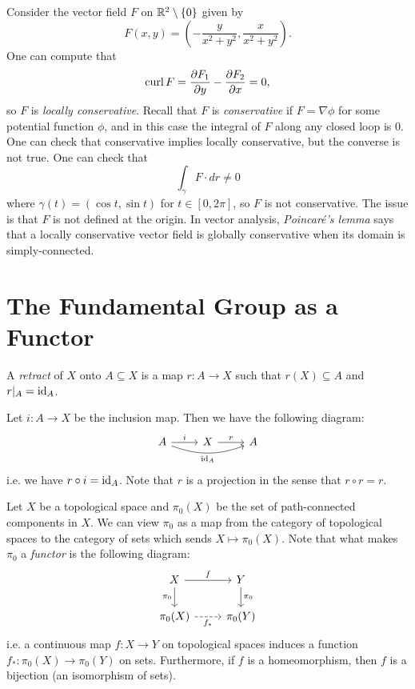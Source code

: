 \begin{example}
  Consider the vector field $F$ on
  $\mathbb{R}^2 \setminus \{0\}$ given by
  \[
    F(x, y) =
    \left(-\frac{y}{x^2 + y^2}, \frac{x}{x^2 + y^2}\right).
  \]
  One can compute that
  \[
    \operatorname{curl} F = \frac{\partial F_1}{\partial y} - \frac{\partial F_2}{\partial x} = 0,
  \]
  so $F$ is \emph{locally conservative}. Recall that
  $F$ is \emph{conservative} if $F = \nabla \phi$
  for some potential function $\phi$, and in this
  case the integral of $F$ along any closed loop is
  $0$. One can check
  that conservative implies locally conservative,
  but the converse is not true. One can check that
  \[
    \int_{\gamma} F \cdot dr \ne 0
  \]
  where $\gamma(t) = (\cos t, \sin t)$ for
  $t \in [0, 2\pi]$, so $F$ is not conservative.
  The issue is that $F$ is not defined at the origin.
  In vector analysis, \emph{Poincar\'e's lemma}
  says that a locally conservative vector field is
  globally conservative when its domain
  is simply-connected.
\end{example}

\section{The Fundamental Group as a Functor}
\begin{definition}
  A \emph{retract} of $X$ onto $A \subseteq X$ is a
  map $r : A \to X$ such that $r(X) \subseteq A$
  and $r|_A = \operatorname{id}_A$.
\end{definition}

\begin{remark}
  Let $i : A \to X$ be the inclusion map. Then
  we have the following diagram:
  \[
    \begin{tikzcd}
      A \ar[r, "i"] \ar[rr, bend right=20, "\id_A", swap]& X \ar[r, "r"] & A
    \end{tikzcd}
  \]
  i.e. we have $r \circ i = \operatorname{id}_A$. Note
  that $r$ is a projection in the sense that
  $r \circ r = r$.
\end{remark}

\begin{example}[Functoriality]
  Let $X$ be a topological space and
  $\pi_0(X)$ be the set of path-connected
  components in $X$. We can view $\pi_0$ as a
  map from the category of topological spaces to
  the category of sets which sends
  $X \mapsto \pi_0(X)$. Note that what makes
  $\pi_0$ a \emph{functor} is the following
  diagram:
  \[
    \begin{tikzcd}
      X \ar[r, "f"] \ar[d, "\pi_0"'] & Y \ar[d, "\pi_0"] \\
      \pi_0(X) \ar[r, "f_*"', dashed] & \pi_0(Y)
    \end{tikzcd}
  \]
  i.e. a continuous map $f : X \to Y$ on topological
  spaces
  induces a function $f_* : \pi_0(X) \to \pi_0(Y)$
  on sets. Furthermore, if $f$ is a homeomorphism,
  then $f$ is a bijection (an isomorphism of sets).
\end{example}

